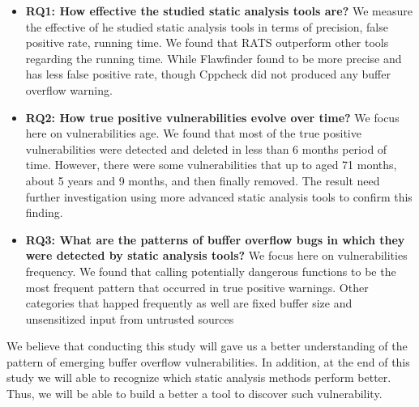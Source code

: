 \begin{itemize}
\item \textbf{RQ1: How effective the studied static analysis tools are?}
We  measure the effective of he studied static analysis tools in terms of precision, false positive rate, running time. We found that RATS outperform other tools regarding the running time. While Flawfinder found to be more precise and has less false positive rate, though Cppcheck did not produced any buffer overflow warning.
\item \textbf{RQ2: How true positive vulnerabilities evolve over time?}
We focus here on vulnerabilities age. We found that  most of the true positive vulnerabilities were detected and deleted in less than 6 months period of time. However, there were some vulnerabilities that up to aged 71 months, about 5 years and 9 months, and then finally removed. The result need further investigation using more advanced static analysis tools to confirm this finding.

\item \textbf{RQ3: What are the patterns of buffer overflow bugs in which they were detected by static analysis tools?}
We focus here on vulnerabilities frequency. We found that calling potentially dangerous functions to be the most frequent pattern that occurred in true positive warnings. Other categories that happed frequently as well are fixed buffer size and unsensitized input from untrusted sources
\end{itemize}


We believe that conducting this study will gave us a better understanding of the pattern of emerging buffer overflow vulnerabilities. In addition, at the end of this study we will able to recognize which static analysis methods perform better. Thus, we will be able to build a better a tool to discover such vulnerability.
